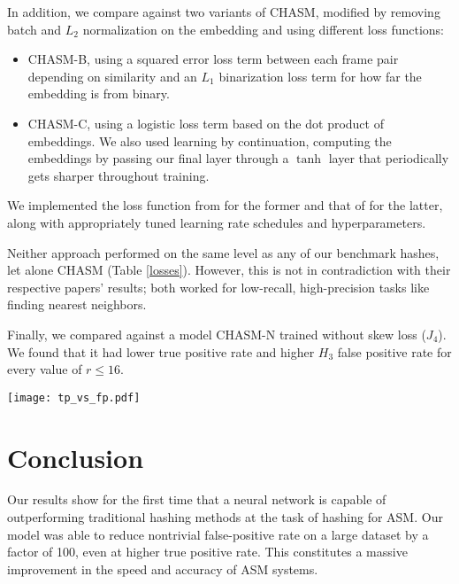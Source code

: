 \documentclass{article}
\renewenvironment{figure}{\par\medskip\noindent\minipage{\linewidth}}{\endminipage\par\medskip}
\begin{document}
\begin{multicols}{2}
In addition, we compare against two variants of CHASM, modified by removing batch and $L_2$ normalization on the embedding and using different loss functions:
\begin{itemize}
\item CHASM-B, using a squared error loss term between each frame pair depending on similarity and an $L_1$ binarization loss term for how far the embedding is from binary.
\item CHASM-C, using a logistic loss term based on the dot product of embeddings. We also used learning by continuation, computing the embeddings by passing our final layer through a $\tanh$ layer that periodically gets sharper throughout training.
\end{itemize}
We implemented the loss function from \cite{supervised16} for the former and that of \cite{hashnet17} for the latter, along with appropriately tuned learning rate schedules and hyperparameters.

Neither approach performed on the same level as any of our benchmark hashes, let alone CHASM (Table \ref{losses}).
However, this is not in contradiction with their respective papers' results; both worked for low-recall, high-precision tasks like finding nearest neighbors.

Finally, we compared against a model CHASM-N trained without skew loss ($J_4$). We found that it had lower true positive rate and higher $H_3$ false positive rate for every value of $r \le 16$.

\begin{figure}
\texttt{[image: tp\_vs\_fp.pdf]}
\label{roc}
\end{figure}


\section{Conclusion}

Our results show for the first time that a neural network is capable of outperforming traditional hashing methods at the task of hashing for ASM.
Our model was able to reduce nontrivial false-positive rate on a large dataset by a factor of 100, even at higher true positive rate.
This constitutes a massive improvement in the speed and accuracy of ASM systems.


\end{multicols}
\end{document}
